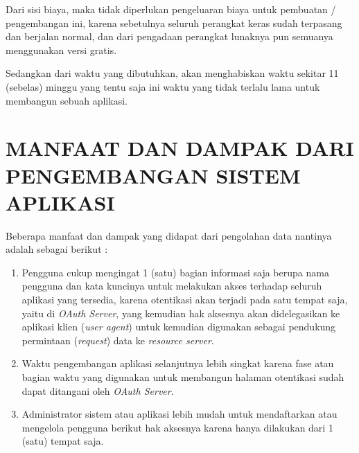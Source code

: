 \documentclass[pdftex,12pt, oneside]{article}
\begin{document}
Dari sisi biaya, maka tidak diperlukan pengeluaran biaya untuk pembuatan / pengembangan ini, karena sebetulnya seluruh perangkat keras sudah terpasang dan berjalan normal, dan dari pengadaan perangkat lunaknya pun semuanya menggunakan versi gratis.

Sedangkan dari waktu yang dibutuhkan, akan menghabiskan waktu sekitar 11 (sebelas) minggu yang tentu saja ini waktu yang tidak terlalu lama untuk membangun sebuah aplikasi.

\section{MANFAAT DAN DAMPAK DARI PENGEMBANGAN SISTEM APLIKASI}

Beberapa manfaat dan dampak yang didapat dari pengolahan data nantinya adalah sebagai berikut :

\begin{enumerate}

	\item Pengguna cukup mengingat 1 (satu) bagian informasi saja berupa nama pengguna dan kata kuncinya untuk melakukan akses terhadap seluruh aplikasi yang tersedia, karena otentikasi akan terjadi pada satu tempat saja, yaitu di \textit{OAuth Server}, yang kemudian hak aksesnya akan didelegasikan ke aplikasi klien (\textit{user agent}) untuk kemudian digunakan sebagai pendukung permintaan (\textit{request}) data ke \textit{resource server}.
	
	\item Waktu pengembangan aplikasi selanjutnya lebih singkat karena fase atau bagian waktu yang digunakan untuk membangun halaman otentikasi sudah dapat ditangani oleh \textit{OAuth Server}.
	
	\item Administrator sistem atau aplikasi lebih mudah untuk mendaftarkan atau mengelola pengguna berikut hak aksesnya karena hanya dilakukan dari 1 (satu) tempat saja.
	
\end{enumerate}
\end{document}
